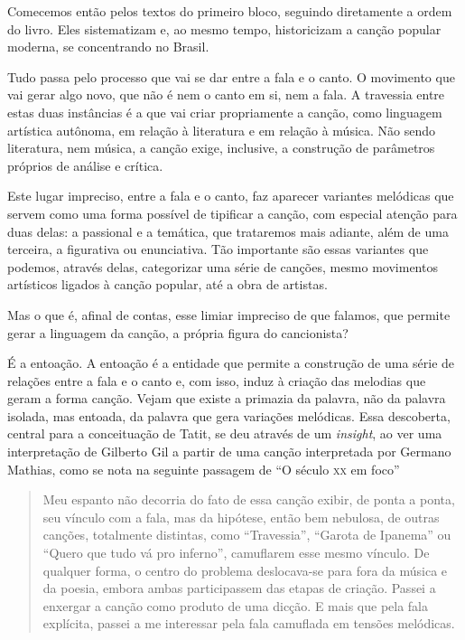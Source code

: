 Comecemos então pelos textos do primeiro bloco, seguindo diretamente a
ordem do livro. Eles sistematizam e, ao mesmo tempo, historicizam a
canção popular moderna, se concentrando no Brasil.

Tudo passa pelo processo que vai se dar entre a fala e o canto. O
movimento que vai gerar algo novo, que não é nem o canto em si, nem a
fala. A travessia entre estas duas instâncias é a que vai criar
propriamente a canção, como linguagem artística autônoma, em relação à
literatura e em relação à música. Não sendo literatura, nem música, a
canção exige, inclusive, a construção de parâmetros próprios de análise
e crítica.

Este lugar impreciso, entre a fala e o canto, faz aparecer variantes
melódicas que servem como uma forma possível de tipificar a canção, com
especial atenção para duas delas: a passional e a temática, que
trataremos mais adiante, além de uma terceira, a figurativa ou
enunciativa. Tão importante são essas variantes que podemos, através
delas, categorizar uma série de canções, mesmo movimentos artísticos
ligados à canção popular, até a obra de artistas.

Mas o que é, afinal de contas, esse limiar impreciso de que falamos, que
permite gerar a linguagem da canção, a própria figura do cancionista?

É a entoação. A entoação é a entidade que permite a construção de uma
série de relações entre a fala e o canto e, com isso, induz à criação
das melodias que geram a forma canção. Vejam que existe a primazia da
palavra, não da palavra isolada, mas entoada, da palavra que gera
variações melódicas. Essa descoberta, central para a conceituação de
Tatit, se deu através de um \textit{insight}, ao ver uma interpretação de
Gilberto Gil a partir de uma canção interpretada por Germano Mathias,
como se nota na seguinte passagem de ``O século \textsc{xx} em foco''

\begin{quote}
Meu espanto não decorria do fato de essa canção exibir, de ponta a
ponta, seu vínculo com a fala, mas da hipótese, então bem nebulosa, de
outras canções, totalmente distintas, como ``Travessia'', ``Garota de Ipanema''
ou ``Quero que tudo vá pro inferno'', camuflarem esse mesmo vínculo. De
qualquer forma, o centro do problema deslocava-se para fora da música e
da poesia, embora ambas participassem das etapas de criação. Passei a
enxergar a canção como produto de uma dicção. E mais que pela fala
explícita, passei a me interessar pela fala camuflada em tensões
melódicas.
\end{quote}

